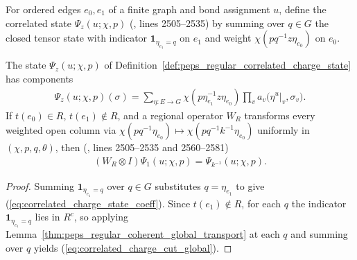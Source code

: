 \begin{definition}
    \label{def:peps_regular_correlated_charge_state}
    \leanok
    For ordered edges $e_0,e_1$ of a finite graph and bond assignment $u$, define the correlated state $\Psi_z(u;\chi,p)$ (\cite{Schuch2010PEPS}, lines 2505--2535) by summing over $q\in G$ the closed tensor state with indicator $\mathbf1_{\eta_{e_1}=q}$ on $e_1$ and weight $\chi(pq^{-1}z\eta_{e_0})$ on $e_0$.
\end{definition}

\begin{lemma}
    \label{thm:peps_regular_correlated_charge_cut}
    \leanok
    The state $\Psi_z(u;\chi,p)$ of Definition~\ref{def:peps_regular_correlated_charge_state} has components
    \begin{align}
        \Psi_z(u;\chi,p)(\sigma)
        =\sum_{\eta:E\to G}\chi(p\eta_{e_1}^{-1}z\eta_{e_0})
        \prod_v a_v\bigl(\eta^{u}|_v,\sigma_v\bigr). \label{eq:correlated_charge_state_coeff}
    \end{align}
    If $t(e_0)\in R$, $t(e_1)\notin R$, and a regional operator $W_R$ transforms every weighted open column via $\chi(pq^{-1}\eta_{e_0})\mapsto\chi(pq^{-1}k^{-1}\eta_{e_0})$ uniformly in $(\chi,p,q,\theta)$, then (\cite{Schuch2010PEPS}, lines 2505--2535 and 2560--2581)
    \begin{align}
        (W_R\otimes I)\Psi_1(u;\chi,p)=\Psi_{k^{-1}}(u;\chi,p). \label{eq:correlated_charge_cut_global}
    \end{align}
\end{lemma}
\begin{proof}\leanok
    Summing $\mathbf1_{\eta_{e_1}=q}$ over $q\in G$ substitutes $q=\eta_{e_1}$ to give (\ref{eq:correlated_charge_state_coeff}).
    Since $t(e_1)\notin R$, for each $q$ the indicator $\mathbf1_{\eta_{e_1}=q}$ lies in $R^c$, so applying Lemma~\ref{thm:peps_regular_coherent_global_transport} at each $q$ and summing over $q$ yields (\ref{eq:correlated_charge_cut_global}).
\end{proof}

